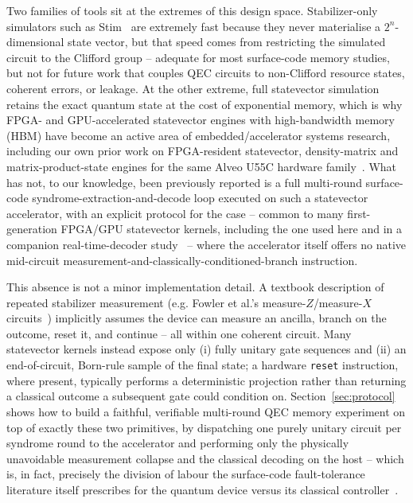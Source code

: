 \documentclass[pdflatex,sn-mathphys,Numbered]{sn-jnl}
\begin{document}
Two families of tools sit at the extremes of this design space. Stabilizer-only simulators such as Stim~\cite{gidney2021stim} are extremely fast because they never materialise a $2^{n}$-dimensional state vector, but that speed comes from restricting the simulated circuit to the Clifford group -- adequate for most surface-code memory studies, but not for future work that couples QEC circuits to non-Clifford resource states, coherent errors, or leakage. At the other extreme, full statevector simulation retains the exact quantum state at the cost of exponential memory, which is why FPGA- and GPU-accelerated statevector engines with high-bandwidth memory (HBM) have become an active area of embedded/accelerator systems research, including our own prior work on FPGA-resident statevector, density-matrix and matrix-product-state engines for the same Alveo U55C hardware family~\cite{ali_rtl_statevector,ali_30qubit_sim,ali_mps_engine}. What has not, to our knowledge, been previously reported is a full multi-round surface-code syndrome-extraction-and-decode loop executed on such a statevector accelerator, with an explicit protocol for the case -- common to many first-generation FPGA/GPU statevector kernels, including the one used here and in a companion real-time-decoder study~\cite{ali_shor_steane_qec} -- where the accelerator itself offers no native mid-circuit measurement-and-classically-conditioned-branch instruction.

This absence is not a minor implementation detail. A textbook description of repeated stabilizer measurement (e.g. Fowler et al.'s measure-$Z$/measure-$X$ circuits~\cite{fowler2012}) implicitly assumes the device can measure an ancilla, branch on the outcome, reset it, and continue -- all within one coherent circuit. Many statevector kernels instead expose only (i) fully unitary gate sequences and (ii) an end-of-circuit, Born-rule sample of the final state; a hardware \texttt{reset} instruction, where present, typically performs a deterministic projection rather than returning a classical outcome a subsequent gate could condition on. Section~\ref{sec:protocol} shows how to build a faithful, verifiable multi-round QEC memory experiment on top of exactly these two primitives, by dispatching one purely unitary circuit per syndrome round to the accelerator and performing only the physically unavoidable measurement collapse and the classical decoding on the host -- which is, in fact, precisely the division of labour the surface-code fault-tolerance literature itself prescribes for the quantum device versus its classical controller~\cite{dennis2002}.
\end{document}
